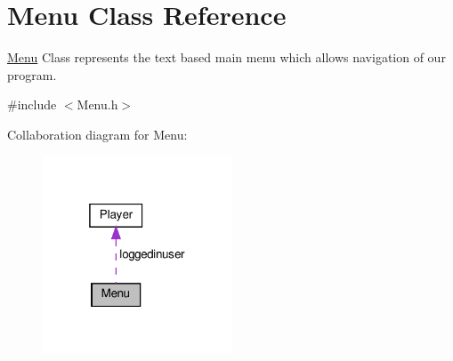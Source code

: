 \hypertarget{classMenu}{}\section{Menu Class Reference}
\label{classMenu}


\hyperlink{classMenu}{Menu} Class represents the text based main menu which allows navigation of our program.  




{\ttfamily \#include $<$Menu.\+h$>$}



Collaboration diagram for Menu\+:\nopagebreak
\begin{figure}[H]
\begin{center}
\leavevmode
\includegraphics[width=160pt]{classMenu__coll__graph}
\end{center}
\end{figure}
